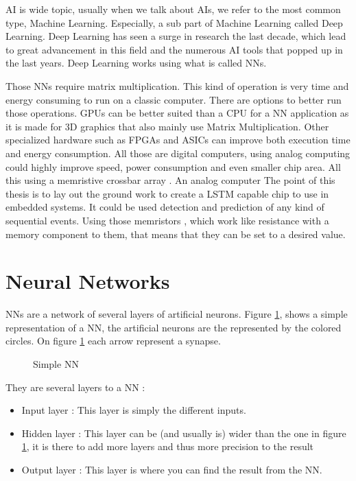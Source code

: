 
\ac{AI} is wide topic, usually when we talk about \acp{AI}, we refer to the most common type, Machine Learning. Especially, a sub part of Machine Learning called Deep Learning. Deep Learning has seen a surge in research the last decade, which lead to great advancement in this field and the numerous \ac{AI} tools that popped up in the last years.
Deep Learning works using what is called \acp{NN}.

Those \acp{NN} require matrix multiplication. This kind of operation is very time and energy consuming to run on a classic computer. There are options to better run those operations. GPUs can be better suited than a CPU for a \ac{NN} application as it is made for 3D graphics that also mainly use Matrix Multiplication. Other specialized hardware such as FPGAs and ASICs can improve both execution time and energy consumption. All those are digital computers, using analog computing could highly improve speed, power consumption and even smaller chip area. All this using a memristive crossbar array \cite{Xbar}. An analog computer
The point of this thesis is to lay out the ground work to create a LSTM capable chip to use in embedded systems. It could be used detection and prediction of any kind of sequential events.
Using those memristors \cite{TheoMemristor}, which work like resistance with a memory component to them, that means that they can be set to a desired value.

\section{Neural Networks}\label{sec:nn}

\acfp{NN} are a network of several layers of artificial neurons. Figure \ref{fig:snn}, shows a simple representation of a \ac{NN}, the artificial neurons are the represented by the colored circles. On figure \ref{fig:snn} each arrow represent a synapse.

\begin{figure}[h!]
  \centering
  
  \caption{Simple \acl{NN}}
  \label{fig:snn}
\end{figure}



They are several layers to a \ac{NN} :
\begin{itemize}
  \item Input layer : This layer is simply the different inputs.
  \item Hidden layer : This layer can be (and usually is) wider than the one in figure \ref{fig:snn}, it is there to add more layers and thus more precision to the result
  \item Output layer : This layer is where you can find the result from the \ac{NN}.
\end{itemize}

